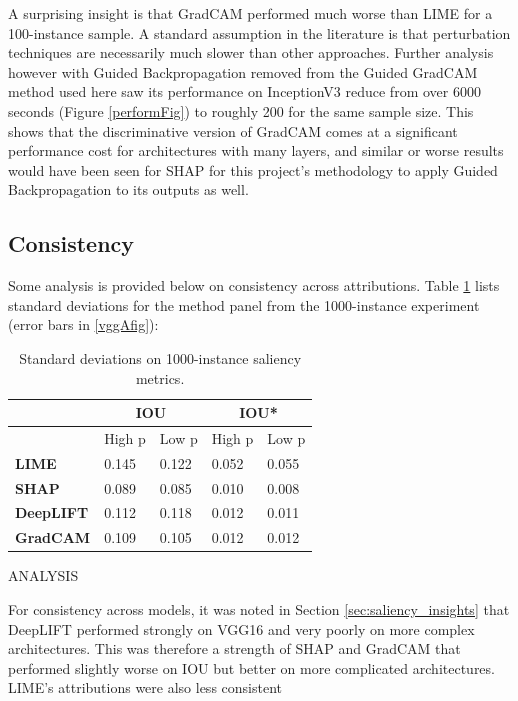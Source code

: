 \documentclass[main]{subfiles}
\begin{document}
A surprising insight is that GradCAM performed much worse than LIME for a 100-instance sample. A standard assumption in the literature is that perturbation techniques are necessarily much slower than other approaches. Further analysis however with Guided Backpropagation removed from the Guided GradCAM method used here saw its performance on InceptionV3 reduce from over 6000 seconds (Figure \ref{performFig}) to roughly 200 for the same sample size. This shows that the discriminative version of GradCAM comes at a significant performance cost for architectures with many layers, and similar or worse results would have been seen for SHAP for this project's methodology to apply Guided Backpropagation to its outputs as well.


\newpage
\subsection{Consistency}
Some analysis is provided below on consistency across attributions. Table \ref{consistencytable} lists standard deviations for the method panel from the 1000-instance experiment (error bars in \ref{vggAfig}):

\begin{table}[htbp]
\centering
\begin{tabular}{|l|l|l|l|l|}
\hline
                  & \multicolumn{2}{c|}{\textbf{IOU}} & \multicolumn{2}{c|}{\textbf{IOU*}} \\ \hline
                  & High p           & Low p          & High p           & Low p           \\ \hline
\textbf{LIME}     & 0.145            & 0.122          & 0.052            & 0.055           \\ \hline
\textbf{SHAP}     & 0.089            & 0.085          & 0.010            & 0.008           \\ \hline
\textbf{DeepLIFT} & 0.112            & 0.118          & 0.012            & 0.011           \\ \hline
\textbf{GradCAM}  & 0.109            & 0.105          & 0.012            & 0.012           \\ \hline
\end{tabular}

\caption{Standard deviations on 1000-instance saliency metrics.}
\label{consistencytable}

\end{table}

ANALYSIS


For consistency across models, it was noted in Section \ref{sec:saliency_insights} that DeepLIFT performed strongly on VGG16 and very poorly on more complex architectures. This was therefore a strength of SHAP and GradCAM that performed slightly worse on IOU but better on more complicated architectures. LIME's attributions were also less consistent
\end{document}
